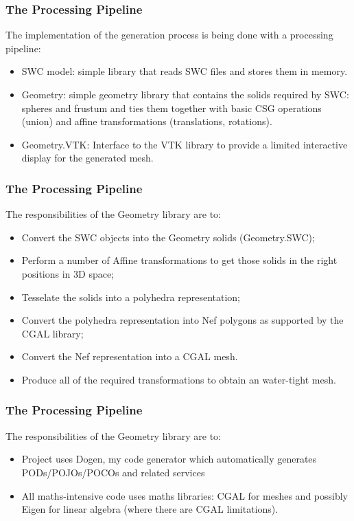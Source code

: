 \documentclass{beamer}
\begin{document}
\begin{frame}
\frametitle{The Processing Pipeline}

The implementation of the generation process is being done with a
processing pipeline:

\begin{itemize}
\item SWC model: simple library that reads SWC files and stores them in
  memory.
\pause
\item Geometry: simple geometry library that contains the solids
  required by SWC: spheres and frustum and ties them together with
  basic CSG operations (union) and affine transformations
  (translations, rotations).
\pause
\item Geometry.VTK: Interface to the VTK library to provide a limited
  interactive display for the generated mesh.
\end{itemize}

\end{frame}

\begin{frame}
\frametitle{The Processing Pipeline}

The responsibilities of the Geometry library are to:

\begin{itemize}
\item Convert the SWC objects into the Geometry solids (Geometry.SWC);
\pause
\item Perform a number of Affine transformations to get those solids
  in the right positions in 3D space;
\pause
\item Tesselate the solids into a polyhedra representation;
\pause
\item Convert the polyhedra representation into Nef polygons as
  supported by the CGAL library;
\pause
\item Convert the Nef representation into a CGAL mesh.
\pause
\item Produce all of the required transformations to obtain an
  water-tight mesh.
\end{itemize}

\end{frame}

\begin{frame}
\frametitle{The Processing Pipeline}

The responsibilities of the Geometry library are to:

\begin{itemize}
\item Project uses Dogen, my code generator which automatically
  generates PODs/POJOs/POCOs and related services
\pause
\item All maths-intensive code uses maths libraries: CGAL for meshes
  and possibly Eigen for linear algebra (where there are CGAL
  limitations).
\end{itemize}

\end{frame}
\end{document}
